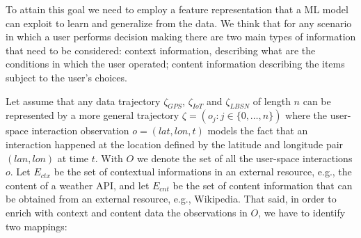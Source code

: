 To attain this goal we need to employ a feature representation 
that a ML 
model can exploit to learn and generalize from the data. 
We think that for any scenario in which a user performs decision making 
there are two main types of information that need to be considered: context information, describing what are the conditions in which the user operated; content information describing the items subject to the user's choices.

Let assume that any data trajectory $\zeta_{GPS}$, $\zeta_{IoT}$ and $\zeta_{LBSN}$ of length $n$ can be represented by a more general trajectory $\zeta = (o_j : j \in \{ 0, \dots, n\})$ where the user-space interaction observation $o = (lat,lon,t)$ models the fact that an interaction 
happened at the location defined by the latitude and longitude pair $(lan,lon)$ at time $t$. With $O$ we denote the set of all the user-space interactions $o$. 
Let $E_{ctx}$ be the set of contextual informations in an external resource, 
e.g., the content of a weather API, and let $E_{cnt}$ be the set of content information that can be obtained from an external resource, e.g., Wikipedia.
That said, in order to enrich with context and content data the observations in $O$, we have to identify two mappings: 
